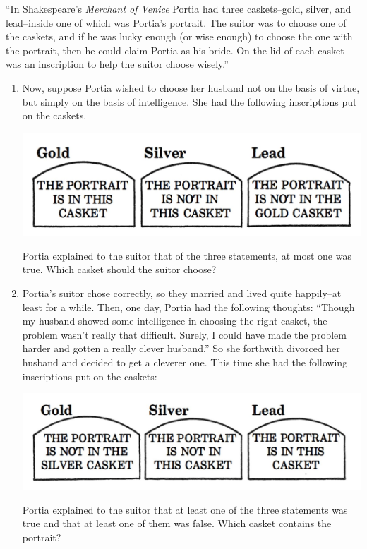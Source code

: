 \documentclass[12pt,letterpaper,boxed,cm]{hmcpset}
\begin{document}
\begin{problem}[3.]
    [4 points] ``In Shakespeare's \emph{Merchant of Venice} Portia had three caskets–gold, silver, and lead–inside one of which was Portia's portrait. The suitor was to choose one of the caskets, and if he was lucky enough (or wise enough) to choose the one with the portrait, then he could claim Portia as his bride. On the lid of each casket was an inscription to help the suitor choose wisely.''
    \begin{enumerate}[label=\Alph*.]
        \item Now, suppose Portia wished to choose her husband not on the basis of virtue, but simply on the basis of intelligence. She had the following inscriptions put on the caskets.
        \begin{center}
            \includegraphics[scale=0.25]{01.JPG}
        \end{center}
        Portia explained to the suitor that of the three statements, at most one was true.  Which casket should the suitor choose?
        \item Portia's suitor chose correctly, so they married and lived quite happily–at least for a while. Then, one day, Portia had the following thoughts: ``Though my husband showed some intelligence in choosing the right casket, the problem wasn't really that difficult. Surely, I could have made the problem harder and gotten a really clever husband.'' So she forthwith divorced her husband and decided to get a clev­erer one.  This time she had the following inscriptions put on the caskets:
        \begin{center}
            \includegraphics[scale=0.25]{02.JPG}
        \end{center}
        Portia explained to the suitor that at least one of the three statements was true and that at least one of them was false.  Which casket contains the portrait?
    \end{enumerate}
\end{problem}
\end{document}

